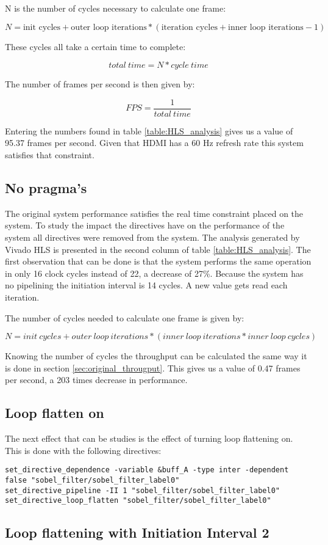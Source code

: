 \documentclass[../thesis.tex]{subfiles}
\begin{document}
N is the number of cycles necessary to calculate one frame:


\[
N =  \text{init cycles} + \text{outer loop iterations} * ( \text{iteration cycles} + \text{inner loop iterations} - 1)
\]


These cycles all take a certain time to complete:

\[
total\ time = N * cycle\ time
\]

The number of frames per second is then given by:

\[
FPS = \frac{1}{total\ time}
\]

Entering the numbers found in table \ref{table:HLS_analysis} gives us a value of 95.37 frames per second. Given that HDMI has a 60 Hz refresh rate this system satisfies that constraint.


\subsection{No pragma's}

The original system performance satisfies the real time constraint placed on the system. To study the impact the directives have on the performance of the system all directives were removed from the  system. The analysis generated by Vivado HLS is presented in the second column of table \ref{table:HLS_analysis}. The first observation that can be done is that the system performs the same operation in only 16 clock cycles instead of 22, a decrease of 27\%. Because the system has no pipelining the initiation interval is 14 cycles. A new value gets read each iteration.

The number of cycles needed to calculate one frame is given by:

\[
N = init\ cycles + outer\ loop\ iterations * (inner\ loop\ iterations * inner\ loop\ cycles) 
\]


Knowing the number of cycles the throughput can be calculated the same way it is done in section \ref{sec:original_througput}. This gives us a value of 0.47 frames per second, a 203 times decrease in performance.

\subsection{Loop flatten on}

The next effect that can be studies is the effect of turning loop flattening on. This is done with the following directives:

\begin{scriptsize}
\begin{verbatim}
set_directive_dependence -variable &buff_A -type inter -dependent false "sobel_filter/sobel_filter_label0"
set_directive_pipeline -II 1 "sobel_filter/sobel_filter_label0"
set_directive_loop_flatten "sobel_filter/sobel_filter_label0"
\end{verbatim}
\end{scriptsize}

\subsection{Loop flattening with Initiation Interval 2}




\end{document}
